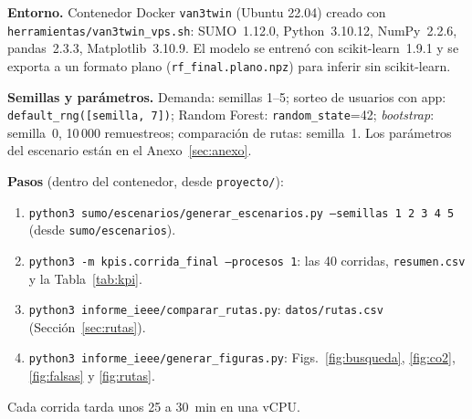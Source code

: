 \documentclass[conference]{IEEEtran}
\newcommand{\cod}[1]{\texttt{#1}}
\begin{document}
\textbf{Entorno.} Contenedor Docker \cod{van3twin} (Ubuntu 22.04) creado con \cod{herramientas/van3twin\_vps.sh}: SUMO~1.12.0, Python~3.10.12, NumPy~2.2.6, pandas~2.3.3, Matplotlib~3.10.9. El modelo se entrenó con scikit-learn~1.9.1 y se exporta a un formato plano (\cod{rf\_final.plano.npz}) para inferir sin scikit-learn.

\textbf{Semillas y parámetros.} Demanda: semillas 1--5; sorteo de usuarios con app: \cod{default\_rng([semilla, 7])}; Random Forest: \cod{random\_state}=42; \emph{bootstrap}: semilla~0, 10\,000 remuestreos; comparación de rutas: semilla~1. Los parámetros del escenario están en el Anexo~\ref{sec:anexo}.

\textbf{Pasos} (dentro del contenedor, desde \cod{proyecto/}):
{\raggedright
\begin{enumerate}
\item \cod{python3 sumo/escenarios/}\allowbreak\cod{generar\_escenarios.py --semillas 1 2 3 4 5} (desde \cod{sumo/escenarios}).
\item \cod{python3 -m kpis.corrida\_final --procesos 1}: las 40 corridas, \cod{resumen.csv} y la Tabla~\ref{tab:kpi}.
\item \cod{python3 informe\_ieee/comparar\_rutas.py}: \cod{datos/rutas.csv} (Sección~\ref{sec:rutas}).
\item \cod{python3 informe\_ieee/generar\_figuras.py}: Figs.~\ref{fig:busqueda}, \ref{fig:co2}, \ref{fig:falsas} y \ref{fig:rutas}.
\end{enumerate}}
Cada corrida tarda unos 25 a 30~min en una vCPU.




\appendix
\end{document}
